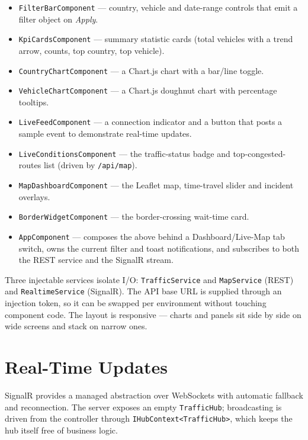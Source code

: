 \documentclass[11pt,a4paper]{article}
\newcommand{\code}[1]{\texttt{\small #1}}
\begin{document}
\begin{itemize}[noitemsep]
  \item \code{FilterBarComponent} --- country, vehicle and date-range controls
        that emit a filter object on \emph{Apply}.
  \item \code{KpiCardsComponent} --- summary statistic cards (total vehicles with
        a trend arrow, counts, top country, top vehicle).
  \item \code{CountryChartComponent} --- a Chart.js chart with a bar/line toggle.
  \item \code{VehicleChartComponent} --- a Chart.js doughnut chart with
        percentage tooltips.
  \item \code{LiveFeedComponent} --- a connection indicator and a button that
        posts a sample event to demonstrate real-time updates.
  \item \code{LiveConditionsComponent} --- the traffic-status badge and
        top-congested-routes list (driven by \code{/api/map}).
  \item \code{MapDashboardComponent} --- the Leaflet map, time-travel slider and
        incident overlays.
  \item \code{BorderWidgetComponent} --- the border-crossing wait-time card.
  \item \code{AppComponent} --- composes the above behind a Dashboard/Live-Map
        tab switch, owns the current filter and toast notifications, and
        subscribes to both the REST service and the SignalR stream.
\end{itemize}

\noindent Three injectable services isolate I/O: \code{TrafficService} and
\code{MapService} (REST) and \code{RealtimeService} (SignalR). The API base URL
is supplied through an injection token, so it can be swapped per environment
without touching component code. The layout is responsive --- charts and panels
sit side by side on wide screens and stack on narrow ones.

\section{Real-Time Updates}
SignalR provides a managed abstraction over WebSockets with automatic fallback
and reconnection. The server exposes an empty \code{TrafficHub}; broadcasting is
driven from the controller through \code{IHubContext<TrafficHub>}, which keeps
the hub itself free of business logic.
\end{document}
